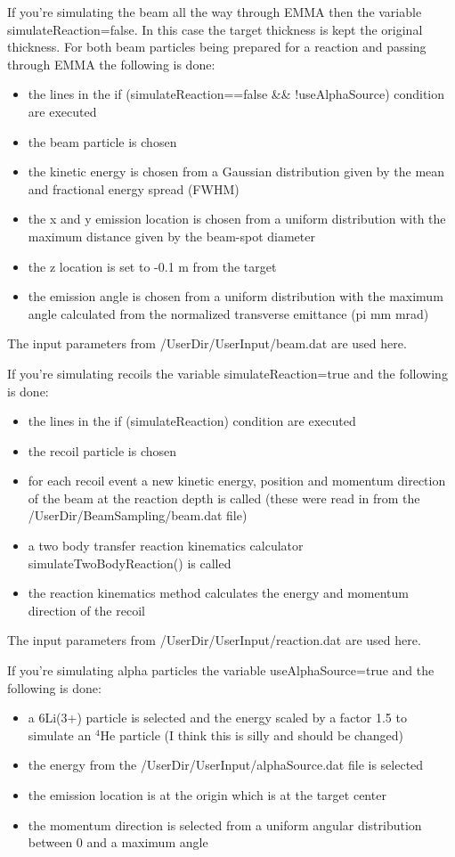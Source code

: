 \documentclass{article}
\newcommand{\filefont}[1]{{\fontfamily{pnc}\selectfont #1}\xspace}
\begin{document}
If you're simulating the beam all the way through EMMA then the variable \filefont{simulateReaction=false}. In this case the target thickness is kept the original thickness. For both beam particles being prepared for a reaction and passing through EMMA the following is done:
\begin{itemize}
\item the lines in the \filefont{if (simulateReaction==false \&\& !useAlphaSource)} condition are executed
\item the beam particle is chosen
\item the kinetic energy is chosen from a Gaussian distribution given by the mean and fractional energy spread (FWHM)
\item the x and y emission location is chosen from a uniform distribution with the maximum distance given by the beam-spot diameter
\item the z location is set to -0.1 m from the target
\item the emission angle is chosen from a uniform distribution with the maximum angle calculated from the normalized transverse emittance (pi mm mrad)
\end{itemize}
The input parameters from \filefont{/UserDir/UserInput/beam.dat} are used here.

If you're simulating recoils the variable \filefont{simulateReaction=true} and the following is done:
\begin{itemize}
\item the lines in the \filefont{if (simulateReaction)} condition are executed
\item the recoil particle is chosen
\item for each recoil event a new kinetic energy, position and momentum direction of the beam at the reaction depth is called (these were read in from the \filefont{/UserDir/BeamSampling/beam.dat} file)
\item a two body transfer reaction kinematics calculator \filefont{simulateTwoBodyReaction()} is called
\item the reaction kinematics method calculates the energy and momentum direction of the recoil
\end{itemize}
The input parameters from \filefont{/UserDir/UserInput/reaction.dat} are used here.

If you're simulating alpha particles the variable \filefont{useAlphaSource=true} and the following is done:
\begin{itemize}
\item a 6Li(3+) particle is selected and the energy scaled by a factor 1.5 to simulate an $^{4}$He particle (I think this is silly and should be changed)
\item the energy from the \filefont{/UserDir/UserInput/alphaSource.dat} file is selected
\item the emission location is at the origin which is at the target center
\item the momentum direction is selected from a uniform angular distribution between 0 and a maximum angle
\end{itemize}
\end{document}
